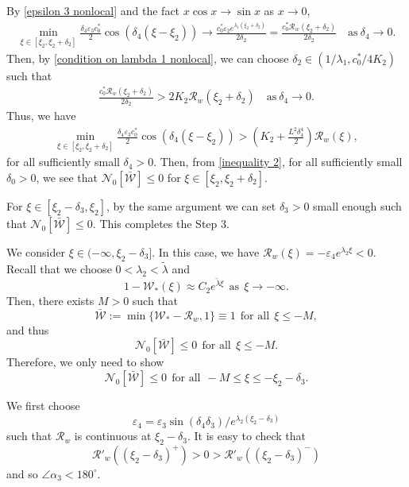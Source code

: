 \documentclass[11pt,a4paper]{article}
\numberwithin{equation}{section}
\numberwithin{figure}{section}
\newcommand\beaa{\begin{eqnarray*}}
\newcommand\eeaa{\end{eqnarray*}}
\begin{document}
By \eqref{epsilon 3 nonlocal} and the fact $x\cos x\to\sin x$ as $x\to 0$,
\beaa
\min_{\xi\in[\xi_2,\xi_2+\delta_2]}\frac{\delta_4\varepsilon_3c_0^*}{2}\cos(\delta_4(\xi-\xi_2))\to\frac{c_0^*\varepsilon_2e^{\lambda_1(\xi_2+\delta_2)}}{2\delta_2}
=\frac{c^*_0\mathcal{R}_w(\xi_2+\delta_2)}{2\delta_2}
\quad\text{as}\ \delta_4\to0.
\eeaa
Then, by \eqref{condition on lambda 1 nonlocal}, we can choose
$\delta_2\in(1/\lambda_1,c_0^*/4K_2)$ such that
\beaa
\frac{c^*_0\mathcal{R}_w(\xi_2+\delta_2)}{2\delta_2}>2 K_2\mathcal{R}_w(\xi_2+\delta_2)
\quad\text{as}\ \delta_4\to0.
\eeaa
Thus, we have
\beaa%
\min_{\xi\in[\xi_2,\xi_2+\delta_2]}\frac{\delta_4\varepsilon_3c_0^*}{2}\cos(\delta_4(\xi-\xi_2))>(K_2+\frac{L^2\delta_4^4}{2})\mathcal{R}_w(\xi),
\eeaa
for all sufficiently small $\delta_4>0$.
Then, from \eqref{inequality 2}, for all sufficiently small $\delta_0>0$, %
we see that $\mathcal{N}_0[\bar{\mathcal W}]\le 0$ for $\xi\in[\xi_2,\xi_2+\delta_2]$.

For $\xi\in[\xi_2-\delta_3,\xi_2]$, by the same argument
we can set $\delta_3>0$ small enough such that
$\mathcal{N}_0[\bar{\mathcal W}]\le 0$. This completes the Step 3.

\medskip

 We consider $\xi\in(-\infty,\xi_2-\delta_3]$. In this case, we have $\mathcal{R}_w(\xi)=-\varepsilon_4e^{\lambda_2\xi}<0$.
Recall that we choose $0<\lambda_2<\tilde\lambda$
and 
$$1-\mathcal{W}_*(\xi)\approx C_2 e^{\tilde\lambda\xi}\ \ \text{as}\ \ \xi\to-\infty.$$
Then, there exists $M>0$ such that 
$$\bar{\mathcal W}:=\min\{\mathcal{W}_*-\mathcal{R}_w,1\}\equiv 1\ \ \text{for all}\ \ \xi\le -M,$$
and thus 
$$\mathcal{N}_0[\bar{\mathcal W}]\le 0\  \ \text{for all}\ \ \xi\le -M.$$ Therefore, we only need to show 
$$\mathcal{N}_0[\bar{\mathcal W}]\le 0\ \  \text{for all}\ \ -M\le\xi\le -\xi_2-\delta_3.$$

We first choose 
$$\varepsilon_4=\varepsilon_3\sin(\delta_4\delta_3)/e^{\lambda_2(\xi_2-\delta_3)}$$
such that $\mathcal{R}_w$ is continuous at $\xi_2-\delta_3$. It is easy to check that 
$$\mathcal{R}'_w((\xi_2-\delta_3)^+)>0>\mathcal{R}'_w((\xi_2-\delta_3)^-)$$
 and so $\angle\alpha_3< 180^{\circ}$.
\end{document}
